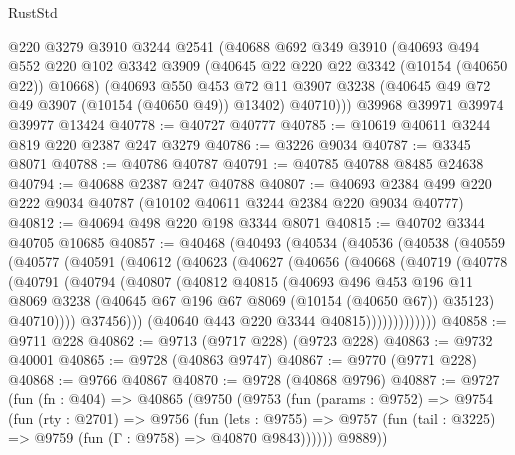 \begin{lexlean}{RustStd}
\begin{coremodule}
    @220
    @3279
    @3910
    @3244
    @2541
    (@40688
      @692
      @349
      @3910
      (@40693
        @494
        @552
        @220
        @102
        @3342
        @3909
        (@40645 @22 @220 @22 @3342 (@10154 (@40650 @22)) @10668)
        (@40693
          @550
          @453
          @72
          @11
          @3907
          @3238
          (@40645 @49 @72 @49 @3907 (@10154 (@40650 @49)) @13402)
          @40710)))
    @39968
    @39971
    @39974
    @39977
    @13424
@40778 := @40727 @40777
@40785 := @10619 @40611 @3244 @819 @220 @2387 @247 @3279
@40786 := @3226 @9034
@40787 := @3345 @8071
@40788 := @40786 @40787
@40791 := @40785 @40788 @8485 @24638
@40794 := @40688 @2387 @247 @40788
@40807 := @40693 @2384 @499 @220 @222 @9034 @40787 (@10102 @40611 @3244 @2384 @220 @9034 @40777)
@40812 := @40694 @498 @220 @198 @3344 @8071
@40815 := @40702 @3344 @40705 @10685
@40857 := @40468
    (@40493
      (@40534
        (@40536
          (@40538
            (@40559
              (@40577
                (@40591
                  (@40612
                    (@40623
                      (@40627
                        (@40656
                          (@40668
                            (@40719
                              (@40778
                                (@40791
                                  (@40794
                                    (@40807
                                      (@40812
                                        @40815
                                        (@40693
                                          @496
                                          @453
                                          @196
                                          @11
                                          @8069
                                          @3238
                                          (@40645 @67 @196 @67 @8069 (@10154 (@40650 @67)) @35123)
                                          @40710))))
                                  @37456)))
                            (@40640 @443 @220 @3344 @40815)))))))))))))
@40858 := @9711 @228
@40862 := @9713 (@9717 @228) (@9723 @228)
@40863 := @9732 @40001
@40865 := @9728 (@40863 @9747)
@40867 := @9770 (@9771 @228)
@40868 := @9766 @40867
@40870 := @9728 (@40868 @9796)
@40887 := @9727
    (fun (fn : @404) =>
    @40865
      (@9750
        (@9753
          (fun (params : @9752) =>
          @9754
            (fun (rty : @2701) =>
            @9756
              (fun (lets : @9755) =>
              @9757 (fun (tail : @3225) => @9759 (fun (Γ : @9758) => @40870 @9843))))))
        @9889))

\end{coremodule}
\end{lexlean}

